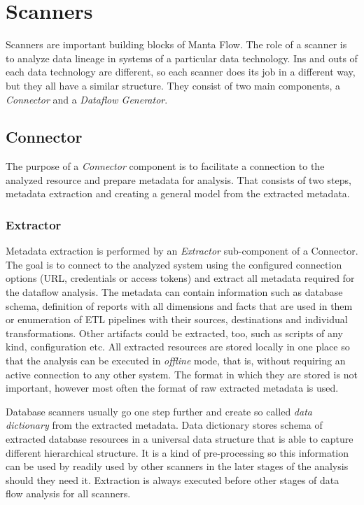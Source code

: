 \section{Scanners}

Scanners are important building blocks of Manta Flow. The role of a scanner is to analyze data lineage in systems of a particular data technology. Ins and outs of each data technology are different, so each scanner does its job in a different way, but they all have a similar structure. They consist of two main components, a \textit{Connector} and a \textit{Dataflow Generator}.

\subsection{Connector}

The purpose of a \textit{Connector} component is to facilitate a connection to the analyzed resource and prepare metadata for analysis. That consists of two steps, metadata extraction and creating a general model from the extracted metadata. 

\subsubsection{Extractor}

Metadata extraction is performed by an \textit{Extractor} sub-component of a Connector. The goal is to connect to the analyzed system using the configured connection options (URL, credentials or access tokens) and extract all metadata required for the dataflow analysis. The metadata can contain information such as database schema, definition of reports with all dimensions and facts that are used in them or enumeration of ETL pipelines with their sources, destinations and individual transformations. Other artifacts could be extracted, too, such as scripts of any kind, configuration etc. All extracted resources are stored locally in one place so that the analysis can be executed in \textit{offline} mode, that is, without requiring an active connection to any other system. The format in which they are stored is not important, however most often the format of raw extracted metadata is used.
\par
Database scanners usually go one step further and create so called \textit{data dictionary} from the extracted metadata. Data dictionary stores schema of extracted database resources in a universal data structure that is able to capture different hierarchical structure. It is a kind of pre-processing so this information can be used by readily used by other scanners in the later stages of the analysis should they need it. Extraction is always executed before other stages of data flow analysis for all scanners. 

